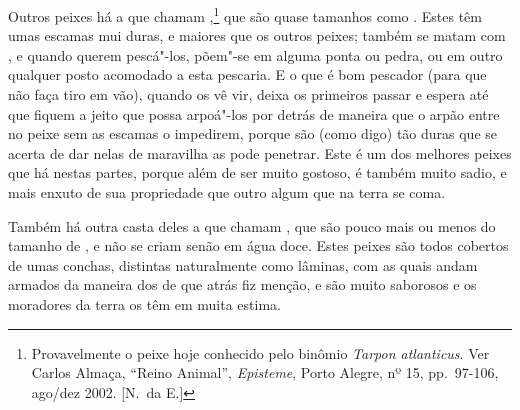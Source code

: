 Outros peixes há a que chamam ,\footnote{ Provavelmente o 
peixe hoje conhecido pelo binômio \textit{Tarpon atlanticus}. Ver Carlos Almaça, ``Reino Animal'', 
\textit{Episteme}, Porto Alegre, nº 15, pp.~97-106, ago/dez 2002. [N.~da E.]} que são quase tamanhos como
. Estes têm umas escamas
mui duras, e maiores que os outros peixes;
também se matam com , e quando querem pescá"-los, põem"-se em alguma
ponta ou pedra, ou em outro qualquer posto acomodado a esta pescaria. E			%
o que é bom pescador (para que não faça tiro em vão), quando os vê vir, 
deixa os primeiros passar e espera até que fiquem a jeito que possa
arpoá"-los por detrás de maneira que o arpão entre no peixe sem as escamas
o impedirem, porque são (como digo) tão duras que se acerta de dar
nelas de maravilha as pode penetrar. Este é um dos melhores peixes que
há nestas partes, porque além de ser muito gostoso, é também muito
sadio, e mais enxuto de sua propriedade que outro algum que na terra se coma.

Também há outra casta deles a que chamam , que são pouco mais ou
menos do tamanho de , e não se criam senão em água doce. Estes
peixes são todos cobertos de umas conchas, distintas naturalmente como
lâminas, com as quais andam armados da maneira dos  de que atrás
fiz menção, e são muito saborosos e os moradores da terra os têm em muita estima. 

